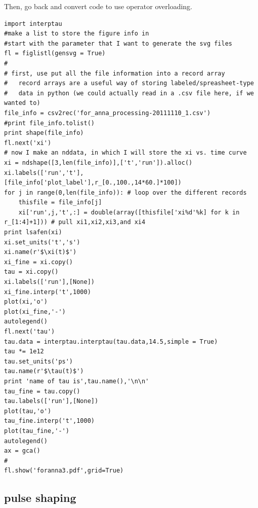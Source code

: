 Then, go back and convert code to use operator overloading. 

\begin{lstlisting}
import interptau
#make a list to store the figure info in
#start with the parameter that I want to generate the svg files
fl = figlistl(gensvg = True)
#
# first, use put all the file information into a record array
#   record arrays are a useful way of storing labeled/spreasheet-type
#   data in python (we could actually read in a .csv file here, if we wanted to)
file_info = csv2rec('for_anna_processing-20111110_1.csv')
#print file_info.tolist()
print shape(file_info)
fl.next('xi')
# now I make an nddata, in which I will store the xi vs. time curve
xi = ndshape([3,len(file_info)],['t','run']).alloc()
xi.labels(['run','t'],[file_info['plot_label'],r_[0.,100.,14*60.]*100])
for j in range(0,len(file_info)): # loop over the different records
    thisfile = file_info[j]
    xi['run',j,'t',:] = double(array([thisfile['xi%d'%k] for k in r_[1:4]+1])) # pull xi1,xi2,xi3,and xi4
print lsafen(xi)
xi.set_units('t','s')
xi.name(r'$\xi(t)$')
xi_fine = xi.copy()
tau = xi.copy()
xi.labels(['run'],[None])
xi_fine.interp('t',1000)
plot(xi,'o')
plot(xi_fine,'-')
autolegend()
fl.next('tau')
tau.data = interptau.interptau(tau.data,14.5,simple = True)
tau *= 1e12
tau.set_units('ps')
tau.name(r'$\tau(t)$')
print 'name of tau is',tau.name(),'\n\n'
tau_fine = tau.copy()
tau.labels(['run'],[None])
plot(tau,'o')
tau_fine.interp('t',1000)
plot(tau_fine,'-')
autolegend()
ax = gca()
#
fl.show('foranna3.pdf',grid=True)
\end{lstlisting}
\subsection{pulse shaping}

